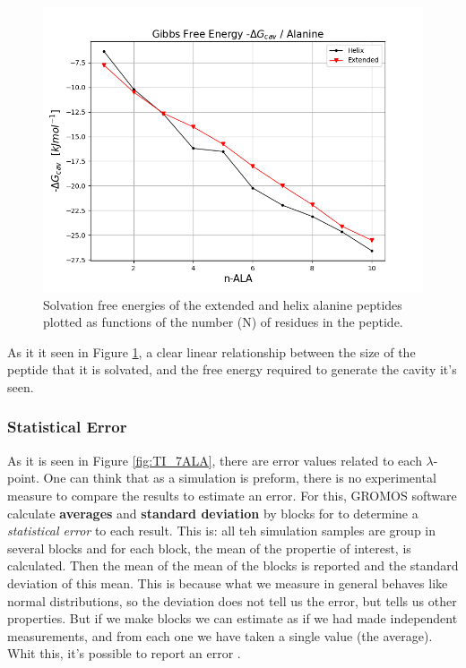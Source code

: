\begin{figure}[h!]
    \centering
    \includegraphics[scale=0.6]{Figures/Chapter_6/results_1.png}
    \caption{Solvation free energies of the extended and helix alanine peptides plotted as functions of the number (N) of residues in the peptide.}
    \label{fig:DG_total}
\end{figure}

As it it seen in Figure \ref{fig:DG_total}, a clear linear relationship between the size of the peptide that it is solvated, and the free energy required to generate the cavity it's seen. 

\subsubsection{Statistical Error}
As it is seen in Figure \ref{fig:TI_7ALA}, there are error values related to each $\lambda$-point. One can think that as a simulation is preform, there is no experimental measure to compare the results to estimate an error.
For this, GROMOS software calculate \textbf{averages} and \textbf{standard deviation} by blocks for to determine a \textit{statistical error} to each result. This is: all teh simulation samples are group in several blocks and for each block, the mean of the propertie of interest, is calculated. Then the mean of the mean of the blocks is reported and the standard deviation of this mean. This is because what we measure in general behaves like normal distributions, so the deviation does not tell us the error, but tells us other properties. But if we make blocks we can estimate as if we had made independent measurements, and from each one we have taken a single value (the average). Whit this, it's possible to report an error \cite{allen2017computer}. 

